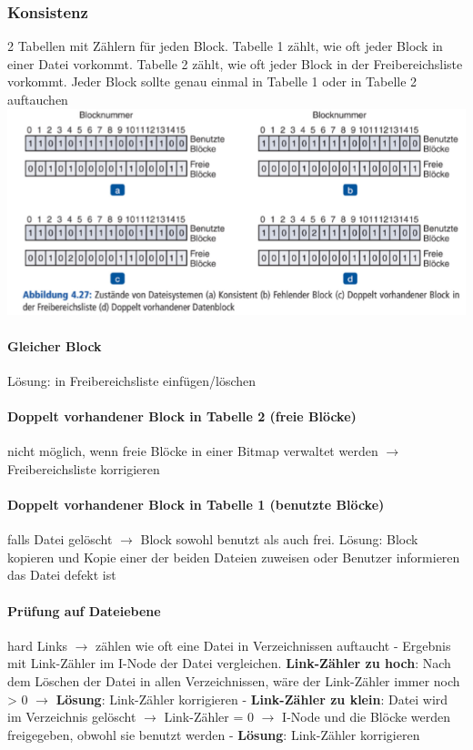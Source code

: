 \documentclass[11pt,a4paper,landscape]{article}
\begin{document}
\begin{multicols*}{3}
	\subsubsection{Konsistenz}
	2 Tabellen mit Zählern für jeden Block. Tabelle 1 zählt, wie oft jeder Block in einer Datei vorkommt. Tabelle 2 zählt, wie oft jeder Block in der Freibereichsliste vorkommt. Jeder Block sollte genau einmal in Tabelle 1 oder in Tabelle 2 auftauchen\\
	\includegraphics[width=0.95\columnwidth]{konsistenz}
	\paragraph{Gleicher Block} Lösung: in Freibereichsliste einfügen/löschen
	\paragraph{Doppelt vorhandener Block in Tabelle 2 (freie Blöcke)} nicht möglich, wenn freie Blöcke in einer Bitmap verwaltet werden $\rightarrow$ Freibereichsliste korrigieren
	\paragraph{Doppelt vorhandener Block in Tabelle 1 (benutzte Blöcke)} falls Datei gelöscht $\rightarrow$ Block sowohl benutzt als auch frei. Lösung: Block kopieren und Kopie einer der beiden Dateien zuweisen oder Benutzer informieren das Datei defekt ist
	\paragraph{Prüfung auf Dateiebene} hard Links $\rightarrow$ zählen wie oft eine Datei in Verzeichnissen auftaucht - Ergebnis mit Link-Zähler im I-Node der Datei vergleichen. \textbf{Link-Zähler zu hoch}: Nach dem Löschen der Datei in allen Verzeichnissen, wäre der Link-Zähler immer noch > 0 $\rightarrow$ \textbf{Lösung}: Link-Zähler korrigieren - \textbf{Link-Zähler zu klein}: Datei wird im Verzeichnis gelöscht $\rightarrow$ Link-Zähler = 0 $\rightarrow$ I-Node und die Blöcke werden freigegeben, obwohl sie benutzt werden - \textbf{Lösung}: Link-Zähler korrigieren

\end{multicols*}
\end{document}
